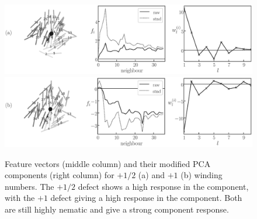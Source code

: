 \begin{figure}[!t]
	\centering
	\begin{minipage}[c]{\columnwidth}
		\centering
		\includegraphics[width=\columnwidth]{./figs/prob_stats_polar2_a.eps}\\
		\vspace{0.5cm}
		\includegraphics[width=\columnwidth]{./figs/prob_stats_polar2_b.eps}
	\end{minipage}%
	\caption{Feature vectors (middle column) and their modified PCA components (right column) for $+1/2$ (a) and $+1$ (b) winding numbers. The $+1/2$ defect shows a high response in the  component, with the $+1$ defect giving a high response in the  component. Both are still highly nematic and give a strong  component response.
	}
	\label{FIG:prob_polar2}
\end{figure}









